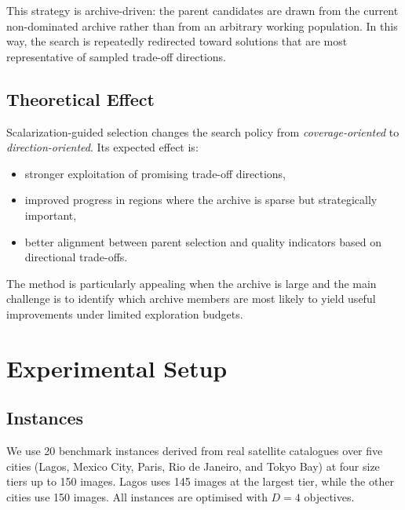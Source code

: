 \documentclass[11pt,a4paper]{article}
\begin{document}
This strategy is archive-driven: the parent candidates are drawn from
the current non-dominated archive rather than from an arbitrary working
population.  In this way, the search is repeatedly redirected toward
solutions that are most representative of sampled trade-off directions.

\subsection{Theoretical Effect}

Scalarization-guided selection changes the search policy from
\emph{coverage-oriented} to \emph{direction-oriented}.  Its expected
effect is:
\begin{itemize}
  \item stronger exploitation of promising trade-off directions,
  \item improved progress in regions where the archive is sparse but
    strategically important,
  \item better alignment between parent selection and quality indicators
    based on directional trade-offs.
\end{itemize}

The method is particularly appealing when the archive is large and the
main challenge is to identify which archive members are most likely to
yield useful improvements under limited exploration budgets.

\section{Experimental Setup}\label{sec:experiments}

\subsection{Instances}

We use 20 benchmark instances derived from real satellite catalogues
over five cities (Lagos, Mexico City, Paris, Rio de Janeiro, and Tokyo
Bay) at four size tiers up to 150 images.  Lagos uses 145 images at the
largest tier, while the other cities use 150 images.  All instances are
optimised with \(D=4\) objectives.
\end{document}
